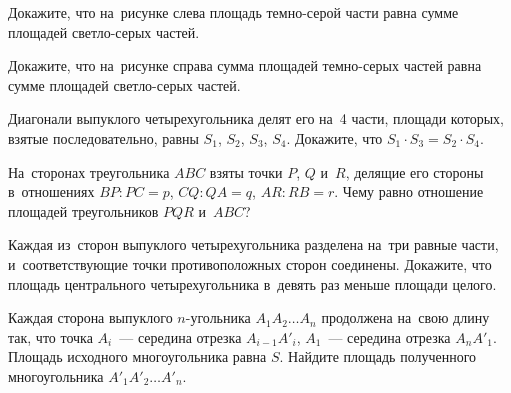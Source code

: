 


\begin{problems}

\item
Докажите, что на~рисунке слева площадь темно-серой части равна сумме площадей
светло-серых частей.

\begin{center}
\hfill
\hfill
\hfill
\null
\end{center}

\item
Докажите, что на~рисунке справа сумма площадей темно-серых частей равна сумме
площадей светло-серых частей.


\item
Диагонали выпуклого четырехугольника делят его на~4 части, площади которых,
взятые последовательно, равны $S_1$, $S_2$, $S_3$, $S_4$.
Докажите, что $S_1 \cdot S_3 = S_2 \cdot S_4$.

\item
На~сторонах треугольника $ABC$ взяты точки $P$, $Q$ и~$R$, делящие его стороны
в~отношениях $BP : PC = p$, $CQ : QA = q$, $AR : RB = r$.
Чему равно отношение площадей треугольников $PQR$ и~$ABC$?

\item
Каждая из~сторон выпуклого четырехугольника разделена на~три равные части,
и~соответствующие точки противоположных сторон соединены.
Докажите, что площадь центрального четырехугольника в~девять раз меньше площади
целого.

\item
Каждая сторона выпуклого $n$-угольника $A_{1}A_{2}{\ldots}A_{n}$ продолжена
на~свою длину так, что точка $A_{i}$~--- середина отрезка $A_{i-1} A'_{i}$,
$A_{1}$~--- середина отрезка $A_{n}A'_{1}$.
Площадь исходного многоугольника равна $S$.
Найдите площадь полученного многоугольника $A'_{1}A'_{2}{\ldots}A'_{n}$.

\end{problems}

